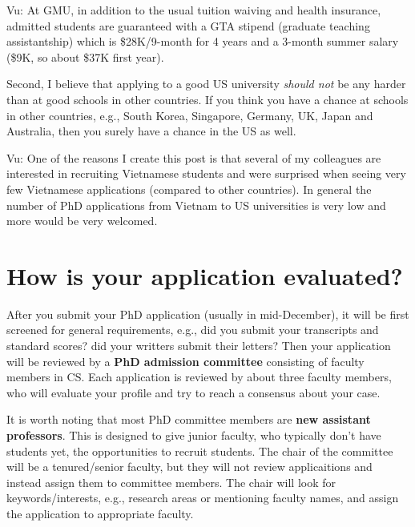\documentclass[10pt]{article}
\begin{document}
\begin{tcolorbox}[left=1pt,right=1pt,top=1pt,bottom=1pt]
Vu: At GMU, in addition to the usual tuition waiving and health insurance,
admitted students are guaranteed with a GTA stipend (graduate teaching
assistantship) which is \$28K/9-month for 4 years and a 3-month summer
salary (\$9K, so about \$37K first year).
\end{tcolorbox}

Second, I believe that applying to a good US university \emph{should not} be any
harder than at good schools in other countries. If you think you have a
chance at schools in other countries, e.g., South Korea, Singapore, Germany, UK, Japan and Australia, then you surely have a chance in
the US as well.

\begin{tcolorbox}[left=1pt,right=1pt,top=1pt,bottom=1pt]
Vu: One of the reasons I create this post is that several of my colleagues are interested in 
recruiting Vietnamese students and were surprised when seeing very few Vietnamese applications (compared to other countries). In general the number of
PhD applications from Vietnam to US universities is very low and  more would be very welcomed. 
\end{tcolorbox}



\section{How is your application evaluated?}

After you submit your PhD application (usually in mid-December), it will be first screened
for general requirements, e.g., did you submit your transcripts and standard scores? did your writters submit their letters?
Then your application will be reviewed by a
\textbf{PhD admission committee} consisting of faculty members in CS. Each application is reviewed by about three faculty members, who will evaluate your profile and try to reach a consensus about your case.

It is worth noting that most PhD committee members are \textbf{new assistant professors}. This is designed to give junior faculty, who typically don't have students yet, the opportunities to recruit students. The chair of the committee will be a tenured/senior faculty, but they will not review applicaitions and instead assign them to committee members. The chair will look for keywords/interests, e.g., research areas or mentioning faculty names, and assign the application to appropriate faculty. 
\end{document}
